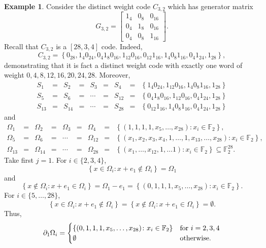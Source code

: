 \documentclass[12pt]{article}
\newcommand{\F}{\mathbb{F}}
\def\F{\mathbb F}
\theoremstyle{definition}
\newtheorem{example}[theorem]{Example}
\begin{document}
\begin{example}
Consider the  distinct weight code $C_{3,2}$ which has generator matrix $$
G_{3,2}=\left[
\begin{array}{ccc}
1_4 & 0_{8} & 0_{16}\\
0_4 & 1_{8} & 0_{16}\\
0_4 & 0_{8} & 1_{16}
\end{array}
\right]. 
$$ Recall that $C_{3,2}$ is a $[28,3,4]$ code. Indeed, 
$$C_{3,2}= \left\{
0_{28}, 1_4 0_{24}, 0_4 1_{8} 0_{16}, 1_{12} 0_{16}, 0_{12} 1_{16}, 1_4 0_8 1_{16}, 0_4 1_{24},  1_{28} \right\}, 
$$
demonstrating that it is fact a distinct weight code with exactly one word of weight \(0, 4, 8,\allowbreak 12, 16, 20, 24, 28.\) Moreover, 
$$
\begin{array}{lclclclcl}
S_1&=&S_2&=&S_3&=&S_4&=&\left\{ 1_4 0_{24}, 1_{12} 0_{16},  1_4 0_8 1_{16},   1_{28} \right\}\\
S_5&=&S_6&=&\cdots&=&S_{12}&=&\left\{ 0_4 1_{8} 0_{16}, 1_{12} 0_{16},  0_4 1_{24},  1_{28}\right\}\\
S_{13}&=&S_{14}&=&\cdots&=&S_{28}&=&\left\{ 0_{12} 1_{16}, 1_4 0_8 1_{16}, 0_4 1_{24},  1_{28} \right\}
 \end{array}
$$
and
$$
\begin{array}{lclclclcl}
\Omega_1&=&\Omega_2&=&\Omega_3&=&\Omega_4&=& \left\{ 
(1, 1, 1, 1, x_5, \dots, x_{28})\colon x_i \in \F_2 \right\},\\
\Omega_5&=&\Omega_6&=&\cdots&=&\Omega_{12}&=& \left\{ 
(x_1, x_2, x_3, x_4, 1, \dots, 1, x_{13}, \dots, x_{28})\colon x_i \in \F_2 
\right\},\\
\Omega_{13}&=&\Omega_{14}&=&\cdots&=&\Omega_{28}&=&\left\{
 (x_1, \dots, x_{12}, 1, \dots 1)\colon x_i \in \F_2  \right\} \subseteq \F_2^{28}.
 \end{array}
$$
Take first $j=1$. For $i \in \{ 2, 3, 4 \}$, 
$$\left\{ x \in \Omega_i\colon x+e_1 \notin \Omega_i \right\}=\Omega_1$$
and $$\left\{ x \notin \Omega_i\colon x+e_1 \in \Omega_i \right\}=\Omega_1 - e_1 = \left\{ (0, 1, 1, 1, x_5, \dots, x_{28})\colon x_i \in \F_2\right\}.$$For $i \in \{ 5, \dots, 28 \}$, 
$$\left\{ x \in \Omega_i\colon x+e_1 \notin \Omega_i \right\}=\left\{ x \notin \Omega_i\colon x+e_1 \in \Omega_i \right\}=\emptyset. $$
Thus, 
$$\partial_1 \Omega_i =
\begin{cases}
\left\{ (0, 1, 1, 1, x_5, \dots, x_{28})\colon x_i \in \F_2\right\} & \textnormal{for } i = 2, 3, 4 \\
\emptyset & \textnormal{otherwise.}
\end{cases}
$$
\end{example}
\end{document}
